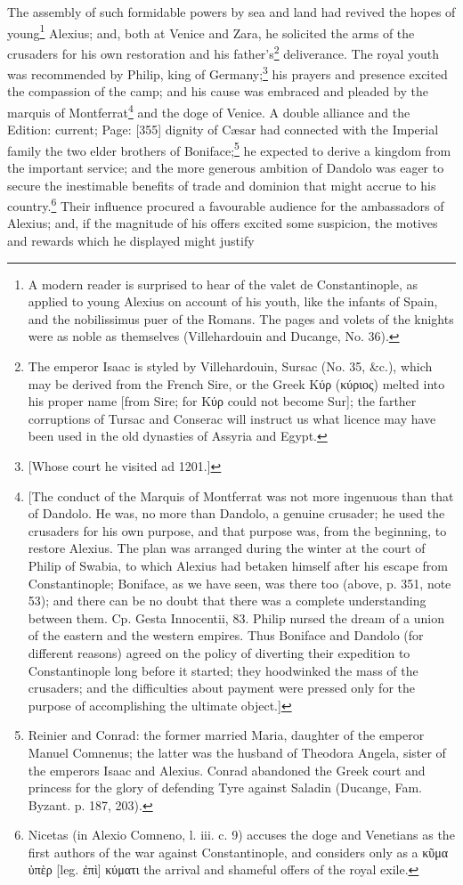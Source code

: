 The assembly of such formidable powers by sea and land had revived the hopes of young\footnote{A modern reader is surprised to hear of the valet de Constantinople, as applied to young Alexius on account of his youth, like the infants of Spain, and the nobilissimus puer of the Romans. The pages and volets of the knights were as noble as themselves (Villehardouin and Ducange, No. 36).} Alexius; and, both at Venice and Zara, he solicited the arms of the crusaders for his own restoration and his father\texthebrew{}’s\footnote{The emperor Isaac is styled by Villehardouin, Sursac (No. 35, \&c.), which may be derived from the French Sire, or the Greek \textgreek{Κύρ} (\textgreek{κύριος}) melted into his proper name [from Sire; for \textgreek{Κύρ} could not become Sur]; the farther corruptions of Tursac and Conserac will instruct us what licence may have been used in the old dynasties of Assyria and Egypt.} deliverance. The royal youth was recommended by Philip, king of Germany;\footnote{[Whose court he visited ad 1201.]} his prayers and presence excited the compassion of the camp; and his cause was embraced and pleaded by the marquis of Montferrat\footnote{[The conduct of the Marquis of Montferrat was not more ingenuous than that of Dandolo. He was, no more than Dandolo, a genuine crusader; he used the crusaders for his own purpose, and that purpose was, from the beginning, to restore Alexius. The plan was arranged during the winter at the court of Philip of Swabia, to which Alexius had betaken himself after his escape from Constantinople; Boniface, as we have seen, was there too (above, p. 351, note 53); and there can be no doubt that there was a complete understanding between them. Cp. Gesta Innocentii, 83. Philip nursed the dream of a union of the eastern and the western empires. Thus Boniface and Dandolo (for different reasons) agreed on the policy of diverting their expedition to Constantinople long before it started; they hoodwinked the mass of the crusaders; and the difficulties about payment were pressed only for the purpose of accomplishing the ultimate object.]} and the doge of Venice. A double alliance and the Edition: current; Page: [355] dignity of Cæsar had connected with the Imperial family the two elder brothers of Boniface;\footnote{Reinier and Conrad: the former married Maria, daughter of the emperor Manuel Comnenus; the latter was the husband of Theodora Angela, sister of the emperors Isaac and Alexius. Conrad abandoned the Greek court and princess for the glory of defending Tyre against Saladin (Ducange, Fam. Byzant. p. 187, 203).} he expected to derive a kingdom from the important service; and the more generous ambition of Dandolo was eager to secure the inestimable benefits of trade and dominion that might accrue to his country.\footnote{Nicetas (in Alexio Comneno, l. iii. c. 9) accuses the doge and Venetians as the first authors of the war against Constantinople, and considers only as a \textgreek{κ\texthebrew{ῦ}μα \texthebrew{ὐ}π\texthebrew{ὲ}ρ} [leg. \textgreek{\texthebrew{ἐ}π\texthebrew{ὶ}}] \textgreek{κύματι} the arrival and shameful offers of the royal exile.} Their influence procured a favourable audience for the ambassadors of Alexius; and, if the magnitude of his offers excited some suspicion, the motives and rewards which he displayed might justify 